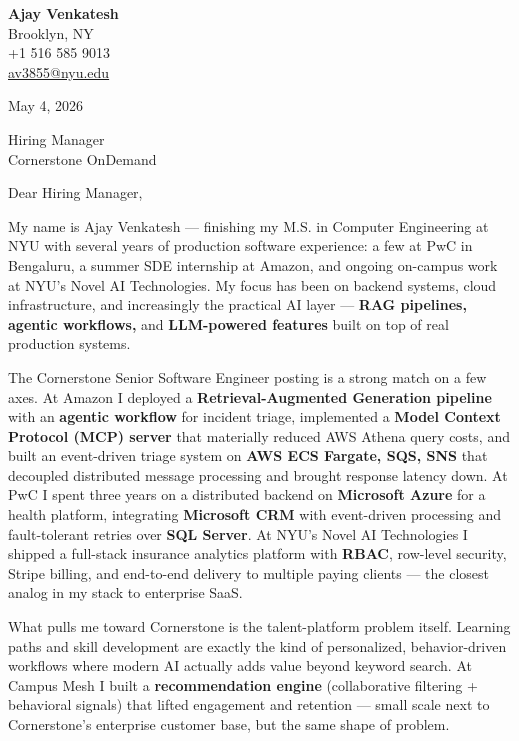 \documentclass[letterpaper,11pt]{article}
\begin{document}
\begin{flushleft}
\textbf{\large Ajay Venkatesh} \\
Brooklyn, NY \\
+1 516 585 9013 \\
\href{mailto:av3855@nyu.edu}{av3855@nyu.edu}
\end{flushleft}

\vspace{10pt}

May 4, 2026

\vspace{6pt}

Hiring Manager \\
Cornerstone OnDemand

\vspace{10pt}

Dear Hiring Manager,

My name is Ajay Venkatesh --- finishing my M.S. in Computer Engineering at NYU with several years of production software experience: a few at PwC in Bengaluru, a summer SDE internship at Amazon, and ongoing on-campus work at NYU's Novel AI Technologies. My focus has been on backend systems, cloud infrastructure, and increasingly the practical AI layer --- \textbf{RAG pipelines, agentic workflows,} and \textbf{LLM-powered features} built on top of real production systems.

The Cornerstone Senior Software Engineer posting is a strong match on a few axes. At Amazon I deployed a \textbf{Retrieval-Augmented Generation pipeline} with an \textbf{agentic workflow} for incident triage, implemented a \textbf{Model Context Protocol (MCP) server} that materially reduced AWS Athena query costs, and built an event-driven triage system on \textbf{AWS ECS Fargate, SQS, SNS} that decoupled distributed message processing and brought response latency down. At PwC I spent three years on a distributed backend on \textbf{Microsoft Azure} for a health platform, integrating \textbf{Microsoft CRM} with event-driven processing and fault-tolerant retries over \textbf{SQL Server}. At NYU's Novel AI Technologies I shipped a full-stack insurance analytics platform with \textbf{RBAC}, row-level security, Stripe billing, and end-to-end delivery to multiple paying clients --- the closest analog in my stack to enterprise SaaS.

What pulls me toward Cornerstone is the talent-platform problem itself. Learning paths and skill development are exactly the kind of personalized, behavior-driven workflows where modern AI actually adds value beyond keyword search. At Campus Mesh I built a \textbf{recommendation engine} (collaborative filtering + behavioral signals) that lifted engagement and retention --- small scale next to Cornerstone's enterprise customer base, but the same shape of problem.
\end{document}
